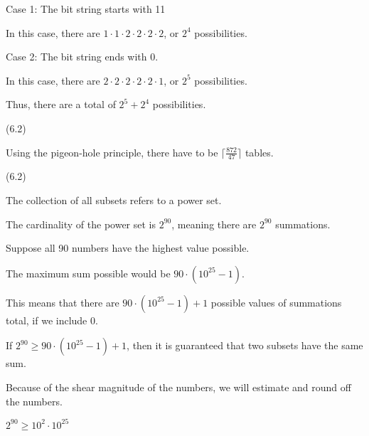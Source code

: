 \documentclass{exam}
\begin{document}
\begin{questions}
\begin{center}
Case 1: The bit string starts with 11

In this case, there are \(1 \cdot 1 \cdot 2 \cdot 2 \cdot 2 \cdot 2\), or \(2^4\) possibilities.
\vspace{5px}

Case 2: The bit string ends with 0.

In this case, there are \(2 \cdot 2 \cdot 2 \cdot 2 \cdot 2 \cdot 1\), or \(2^5\) possibilities.

\vspace{5px}

Thus, there are a total of \(2^5 + 2^4\) possibilities.

\end{center}

 (6.2)

\begin{center}

Using the pigeon-hole principle, there have to be \(\lceil \frac{872}{47} \rceil \) tables.

\end{center}

 (6.2)

\begin{center}

The collection of all subsets refers to a power set.

The cardinality of the power set is \(2^{90}\), meaning there are \(2^{90}\) summations.

Suppose all 90 numbers have the highest value possible.

The maximum sum possible would be \(90 \cdot (10^{25}-1)\).

This means that there are \(90 \cdot (10^{25} - 1) +1\) possible values of summations total, if we include 0.

If \(2^{90} \geq 90 \cdot (10^{25} - 1) + 1\), then it is guaranteed that two subsets have the same sum.

Because of the shear magnitude of the numbers, we will estimate and round off the numbers.

\(2^{90} \geq 10^2 \cdot 10^{25}\)


\end{center}
\end{questions}
\end{document}
